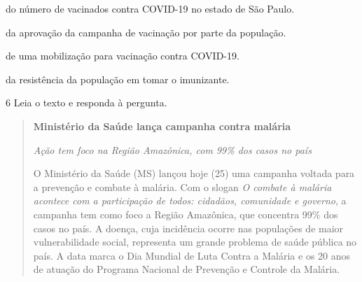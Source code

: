 \begin{escolha}
  \item do número de vacinados contra COVID-19 no estado de São Paulo.

  \item da aprovação da campanha de vacinação por parte da população.

  \item de uma mobilização para vacinação contra COVID-19.

  \item da resistência da população em tomar o imunizante.
\end{escolha}


\num{6} Leia o texto e responda à pergunta.

\begin{quote}
\textbf{Ministério da Saúde lança campanha contra malária}

\textit{Ação tem foco na Região Amazônica, com 99\% dos casos no país}

O Ministério da Saúde (MS) lançou hoje (25) uma campanha voltada para a
prevenção e combate à malária. Com o slogan \textit{O combate à malária acontece
com a participação de todos: cidadãos, comunidade e governo}, a campanha
tem como foco a Região Amazônica, que concentra 99\% dos casos no país. A
doença, cuja incidência ocorre nas populações de maior vulnerabilidade
social, representa um grande problema de saúde pública no país. A data
marca o Dia Mundial de Luta Contra a Malária e os 20 anos de atuação do
Programa Nacional de Prevenção e Controle da Malária.
\end{quote}


